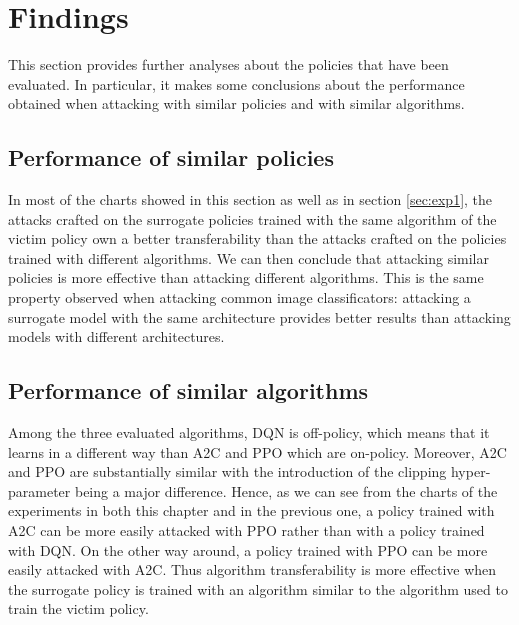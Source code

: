 \section{Findings}
This section provides further analyses about the policies that have been evaluated. In particular, it makes some conclusions about the performance obtained when attacking with similar policies and with similar algorithms.

\subsection{Performance of similar policies}
In most of the charts showed in this section as well as in section \ref{sec:exp1}, the attacks crafted on the surrogate policies trained with the same algorithm of the victim policy own a better transferability than the attacks crafted on the policies trained with different algorithms. We can then conclude that attacking similar policies is more effective than attacking different algorithms. This is the same property observed when attacking common image classificators: attacking a surrogate model with the same architecture provides better results than attacking models with different architectures.

\subsection{Performance of similar algorithms}
Among the three evaluated algorithms, DQN is off-policy, which means that it learns in a different way than A2C and PPO which are on-policy. Moreover, A2C and PPO are substantially similar with the introduction of the clipping hyper-parameter being a major difference. Hence, as we can see from the charts of the experiments in both this chapter and in the previous one, a policy trained with A2C can be more easily attacked with PPO rather than with a policy trained with DQN. On the other way around, a policy trained with PPO can be more easily attacked with A2C. Thus algorithm transferability is more effective when the surrogate policy is trained with an algorithm similar to the algorithm used to train the victim policy.